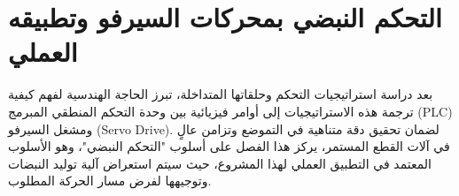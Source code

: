\chapter{التحكم النبضي بمحركات السيرفو وتطبيقه العملي}
\label{ch:servo_pulse_control}

بعد دراسة استراتيجيات التحكم وحلقاتها المتداخلة، تبرز الحاجة الهندسية لفهم كيفية ترجمة هذه الاستراتيجيات إلى أوامر فيزيائية بين وحدة التحكم المنطقي المبرمج (\textenglish{PLC}) ومشغل السيرفو (\textenglish{Servo Drive}). لضمان تحقيق دقة متناهية في التموضع وتزامن عالٍ في آلات القطع المستمر، يركز هذا الفصل على أسلوب "التحكم النبضي"، وهو الأسلوب المعتمد في التطبيق العملي لهذا المشروع، حيث سيتم استعراض آلية توليد النبضات وتوجيهها لفرض مسار الحركة المطلوب.

\vspace{0.5cm}


